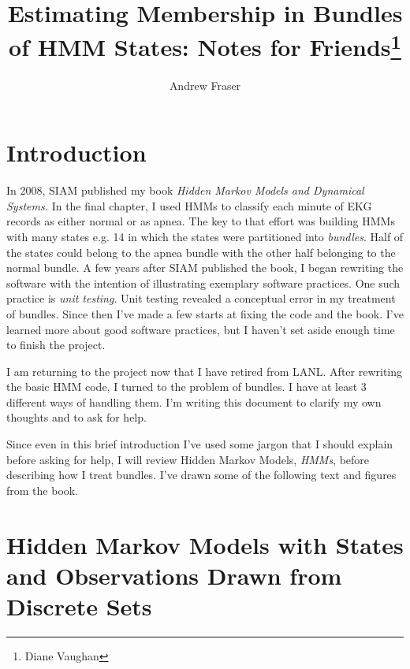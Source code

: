 \documentclass[]{article}
\title{Estimating Membership in Bundles of HMM States: Notes for
  Friends\footnote{Diane Vaughan}}
\author{Andrew Fraser}
\newcommand{\eg}{e.g.\xspace}
\begin{document}
\maketitle

\section{Introduction}\label{sec:introduction}

In 2008, SIAM published my book \emph{Hidden Markov Models and
  Dynamical Systems.}  In the final chapter, I used HMMs to classify
each minute of EKG records as either normal or as apnea.  The key to
that effort was building HMMs with many states \eg 14 in which the
states were partitioned into \emph{bundles}.  Half of the states could
belong to the apnea bundle with the other half belonging to the normal
bundle.  A few years after SIAM published the book, I began rewriting
the software with the intention of illustrating exemplary software
practices.  One such practice is \emph{unit testing}.  Unit testing
revealed a conceptual error in my treatment of bundles.  Since then
I've made a few starts at fixing the code and the book.  I've learned
more about good software practices, but I haven't set aside enough
time to finish the project.

I am returning to the project now that I have retired from LANL.\@
After rewriting the basic HMM code, I turned to the problem of
bundles.  I have at least 3 different ways of handling them.  I'm
writing this document to clarify my own thoughts and to ask for help.

Since even in this brief introduction I've used some jargon that I
should explain before asking for help, I will review Hidden Markov
Models, \emph{HMMs}, before describing how I treat bundles.  I've
drawn some of the following text and figures from the book.

\section{Hidden Markov Models with States and Observations Drawn from
  Discrete Sets}\label{sec:hmms}
\end{document}
